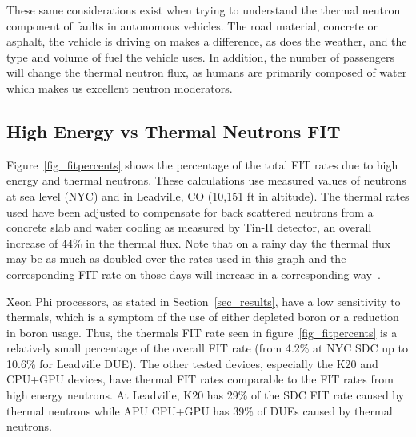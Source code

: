 

These same considerations exist when trying to understand the thermal neutron component of faults in autonomous vehicles. The road material, concrete or asphalt, the vehicle is driving on makes a difference, as does the weather, and the type and volume of fuel the vehicle uses. In addition, the number of passengers will change the thermal neutron flux, as humans are primarily composed of water  which makes us excellent neutron moderators. 

\subsection{High Energy vs Thermal Neutrons FIT}


Figure~\ref{fig_fitpercents} shows the percentage of the total FIT rates due to high energy and thermal neutrons. These calculations use measured values of neutrons at sea level (NYC) and in Leadville, CO (10,151 ft in altitude). The thermal rates used have been adjusted to compensate for back scattered neutrons from a concrete slab and water cooling as measured by Tin-II detector, an overall increase of 44\% in the thermal flux. Note that on a rainy day the thermal flux may be as much as doubled over the rates used in this graph and the corresponding FIT rate on those days will increase in a corresponding way~\cite{ziegler2003}.

Xeon Phi processors, 
 as stated in Section~\ref{sec_results}, have a low sensitivity to thermals, which is a symptom of the use of either depleted boron or a reduction in boron usage. 
 Thus, the thermals FIT rate seen in figure~\ref{fig_fitpercents} is a relatively small percentage of the overall FIT rate (from 4.2\% at NYC SDC up to 10.6\% for Leadville DUE).
The other tested devices, especially the K20 and CPU+GPU devices, have thermal FIT rates comparable to the FIT rates from high energy neutrons. At Leadville, K20 has 29\% of the SDC FIT rate caused by thermal neutrons while APU CPU+GPU has 39\% of DUEs caused by thermal neutrons.

